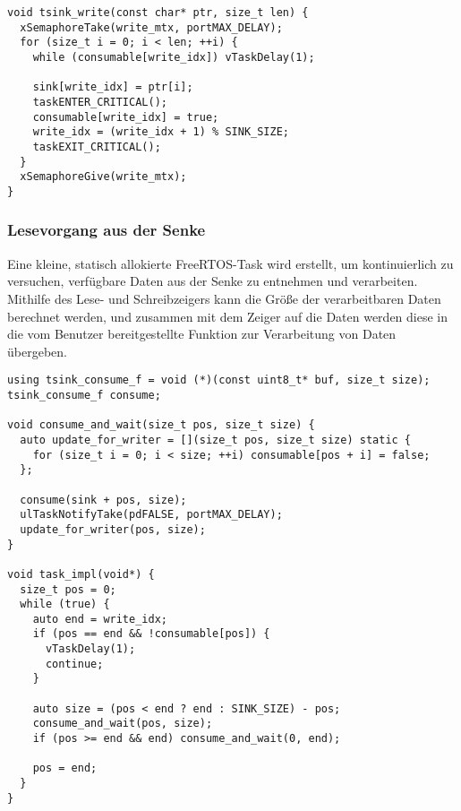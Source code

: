 \begin{code}
\begin{verbatim}
void tsink_write(const char* ptr, size_t len) {
  xSemaphoreTake(write_mtx, portMAX_DELAY);
  for (size_t i = 0; i < len; ++i) {
    while (consumable[write_idx]) vTaskDelay(1);

    sink[write_idx] = ptr[i];
    taskENTER_CRITICAL();
    consumable[write_idx] = true;
    write_idx = (write_idx + 1) % SINK_SIZE;
    taskEXIT_CRITICAL();
  }
  xSemaphoreGive(write_mtx);
}
\end{verbatim}
\end{code}

\subsubsection{Lesevorgang aus der Senke}

Eine kleine, statisch allokierte FreeRTOS-Task wird erstellt, um kontinuierlich
zu versuchen, verfügbare Daten aus der Senke zu entnehmen und verarbeiten.
Mithilfe des Lese- und Schreibzeigers kann die Größe der verarbeitbaren Daten
berechnet werden, und zusammen mit dem Zeiger auf die Daten werden diese in die
vom Benutzer bereitgestellte Funktion zur Verarbeitung von Daten übergeben.

\begin{code}
\begin{verbatim}
using tsink_consume_f = void (*)(const uint8_t* buf, size_t size);
tsink_consume_f consume;

void consume_and_wait(size_t pos, size_t size) {
  auto update_for_writer = [](size_t pos, size_t size) static {
    for (size_t i = 0; i < size; ++i) consumable[pos + i] = false;
  };

  consume(sink + pos, size);
  ulTaskNotifyTake(pdFALSE, portMAX_DELAY);
  update_for_writer(pos, size);
}

void task_impl(void*) {
  size_t pos = 0;
  while (true) {
    auto end = write_idx;
    if (pos == end && !consumable[pos]) {
      vTaskDelay(1);
      continue;
    }

    auto size = (pos < end ? end : SINK_SIZE) - pos;
    consume_and_wait(pos, size);
    if (pos >= end && end) consume_and_wait(0, end);

    pos = end;
  }
}
\end{verbatim}
\end{code}

